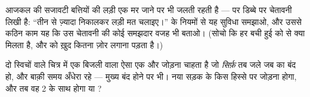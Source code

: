 \begin{exercise}[$\star\star$]\label{exo:g5:series-parallel-circuits:10}
आजकल की सजावटी बत्तियों की लड़ी एक  मर जाने पर भी जलती रहती है
--- पर डिब्बे पर चेतावनी लिखी है: ``तीन से ज़्यादा  निकालकर लड़ी
मत चलाइए।''  के नियमों से यह सुविधा समझाओ, और उससे कठिन काम यह
कि उस चेतावनी की कोई समझदार वजह भी बताओ। (सोचो कि हर बची हुई  को
 से क्या मिलता है, और  को ख़ुद कितना ज़ोर लगाना पड़ता है।)
\end{exercise}

\begin{exercise}[$\star\star$]\label{exo:g5:series-parallel-circuits:11}
दो स्विचों वाले चित्र में एक बिजली वाला ऐसा एक और  जोड़ना चाहता है
जो \emph{सिर्फ़} तब जले जब  का  बंद हो, और बाक़ी समय अँधेरा
रहे --- मुख्य  बंद होने पर भी। नया  सड़क के किस हिस्से पर
जोड़ना होगा, और तब वह  2 के साथ  होगा या ?
\end{exercise}

